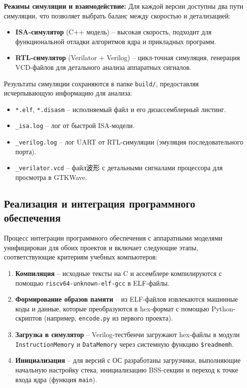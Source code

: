 \textbf{Режимы симуляции и взаимодействие:}
Для каждой версии доступны два пути симуляции, что позволяет выбрать баланс между скоростью и детализацией:
\begin{itemize}
    \item \textbf{ISA-симулятор} (C++ модель) – высокая скорость, подходит для функциональной отладки алгоритмов ядра и прикладных программ.
    \item \textbf{RTL-симулятор} (Verilator + Verilog) – цикл-точная симуляция, генерация VCD-файлов для детального анализа аппаратных сигналов.
\end{itemize}

Результаты симуляции сохраняются в папке \texttt{build/}, предоставляя исчерпывающую информацию для анализа:
\begin{itemize}
    \item \texttt{*.elf}, \texttt{*.disasm} – исполняемый файл и его дизассемблерный листинг.
    \item \texttt{\_isa.log} – лог от быстрой ISA-модели.
    \item \texttt{\_verilog.log} – лог UART от RTL-симуляции (эмуляция последовательного порта).
    \item \texttt{\_verilator.vcd} – файл波形 с детальными сигналами процессора для просмотра в GTKWave.
\end{itemize}

\subsection{Реализация и интеграция программного обеспечения}

Процесс интеграции программного обеспечения с аппаратными моделями унифицирован для обоих проектов и включает следующие этапы, соответствующие критериям учебных компьютеров:

\begin{enumerate}
    \item \textbf{Компиляция} – исходные тексты на C и ассемблере компилируются с помощью \texttt{riscv64-unknown-elf-gcc} в ELF-файлы.
    \item \textbf{Формирование образов памяти} – из ELF-файлов извлекаются машинные коды и данные, которые преобразуются в hex-формат с помощью Python-скриптов (например, \texttt{encode.py} из первого проекта).
    \item \textbf{Загрузка в симулятор} – Verilog-тестбенчи загружают hex-файлы в модули \texttt{InstructionMemory} и \texttt{DataMemory} через системную функцию \texttt{\$readmemh}.
    \item \textbf{Инициализация} – для версий с ОС разработаны загрузчики, выполняющие начальную настройку стека, инициализацию BSS-секции и переход к точке входа ядра (функция \texttt{main}).
\end{enumerate}

